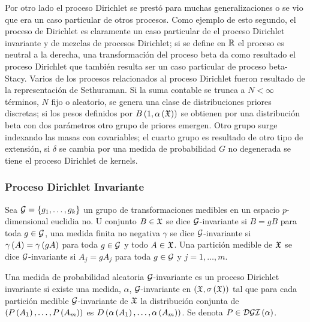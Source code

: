 Por otro lado el proceso Dirichlet se prestó para muchas generalizaciones o se vio que era un caso particular de %
otros procesos. Como ejemplo de esto segundo, el proceso de Dirichlet es claramente un caso particular de el %
proceso Dirichlet invariante y de mezclas de procesos Dirichlet; si se define en $\mathbb{R}$ el proceso es neutral a la %
derecha, una transformación del proceso beta da como resultado el proceso Dirichlet que también resulta ser un %
caso particular de proceso beta-Stacy. Varios de los procesos relacionados al proceso Dirichlet fueron resultado %
de la representación de Sethuraman. Si la suma contable se trunca a $N < \infty$ términos, $N$ fijo o aleatorio, %
se genera una clase de distribuciones priores discretas; si los pesos definidos por $B\left( 1, \alpha\left( \mathfrak{X} \right) \right)$ se %
obtienen por una distribución beta con dos parámetros otro grupo de priores emergen. Otro grupo surge indexando %
las masas con covariables; el cuarto grupo es resultado de otro tipo de extensión, si $\delta$ se cambia por %
una medida de probabilidad $G$ no degenerada se tiene el proceso Dirichlet de kernels.


\subsubsection{Proceso Dirichlet Invariante}

Sea $\mathcal{G} = \left\{ g_1, \ldots, g_{k} \right\}$ un grupo de transformaciones medibles en un espacio $p$-dimensional euclidia%
no. U conjunto $B \in \mathfrak{X}$ se dice $\mathcal{G}$-invariante si $B = gB$ para toda $g \in \mathcal{G}$, una medida finita no %
negativa $\gamma$ se dice $\mathcal{G}$-invariante si $\gamma\left( A \right) = \gamma\left( gA \right)$ para toda $g \in \mathcal{G}$ y todo $A %
\in \X$. Una partición medible de $\mathfrak{X}$ se dice $\mathcal{G}$-invariante si $A_{j} = gA_{j}$ para toda $g \in \mathcal{G}$ y %
$j = 1, \ldots, m$.

\begin{defi}[Dalal]
Una medida de probabilidad aleatoria $\mathcal{G}$-invariante es un proceso Dirichlet invariante si existe una medida, %
$\alpha$, $\mathcal{G}$-invariante en $\left( \mathfrak{X}, \sigma\left( \mathfrak{X} \right) \right)$ tal que para cada partición medible $\mathcal{G}$-invariante %
de $\mathfrak{X}$ la distribución conjunta de $\left( P\left( A_{1} \right), \ldots, P\left( A_{m} \right) \right)$ es $D\Pp{\alpha\Pp{A_{1}}, \ldots, %
\alpha\Pp{A_{m}}}$. Se denota $P \in \mathcal{DGI}\left( \alpha \right)$.
\end{defi}

